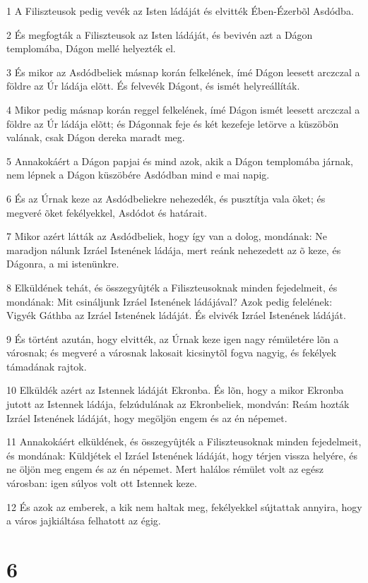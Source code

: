 \par 1 A Filiszteusok pedig vevék az Isten ládáját és elvitték Ében-Ézerbõl Asdódba.
\par 2 És megfogták a Filiszteusok az Isten ládáját, és bevivén azt a Dágon templomába, Dágon mellé helyezték el.
\par 3 És mikor az Asdódbeliek másnap korán felkelének, ímé Dágon leesett arczczal a földre az Úr ládája elõtt. És felvevék Dágont, és ismét helyreállíták.
\par 4 Mikor pedig másnap korán reggel felkelének, ímé Dágon ismét leesett arczczal a földre az Úr ládája elõtt; és Dágonnak feje és két kezefeje letörve a küszöbön valának, csak Dágon dereka maradt meg.
\par 5 Annakokáért a Dágon papjai és mind azok, akik a Dágon templomába járnak, nem lépnek a Dágon küszöbére Asdódban mind e mai napig.
\par 6 És az Úrnak keze az Asdódbeliekre nehezedék, és pusztítja vala õket; és megveré õket fekélyekkel, Asdódot és határait.
\par 7 Mikor azért látták az Asdódbeliek, hogy így van a dolog, mondának: Ne maradjon nálunk Izráel Istenének ládája, mert reánk nehezedett az õ keze, és Dágonra, a mi istenünkre.
\par 8 Elküldének tehát, és összegyûjték a Filiszteusoknak minden fejedelmeit, és mondának: Mit csináljunk Izráel Istenének ládájával? Azok pedig felelének: Vigyék Gáthba az Izráel Istenének ládáját. És elvivék Izráel Istenének ládáját.
\par 9 És történt azután, hogy elvitték, az Úrnak keze igen nagy rémületére lõn a városnak; és megveré a városnak lakosait kicsinytõl fogva nagyig, és fekélyek támadának rajtok.
\par 10 Elküldék azért az Istennek ládáját Ekronba. És lõn, hogy a mikor Ekronba jutott az Istennek ládája, felzúdulának az Ekronbeliek, mondván: Reám hozták Izráel Istenének ládáját, hogy megöljön engem és az én népemet.
\par 11 Annakokáért elküldének, és összegyûjték a Filiszteusoknak minden fejedelmeit, és mondának: Küldjétek el Izráel Istenének ládáját, hogy térjen vissza helyére, és ne öljön meg engem és az én népemet. Mert halálos rémület volt az egész városban: igen súlyos volt ott Istennek keze.
\par 12 És azok az emberek, a kik nem haltak meg, fekélyekkel sújtattak annyira, hogy a város jajkiáltása felhatott az égig.

\chapter{6}

